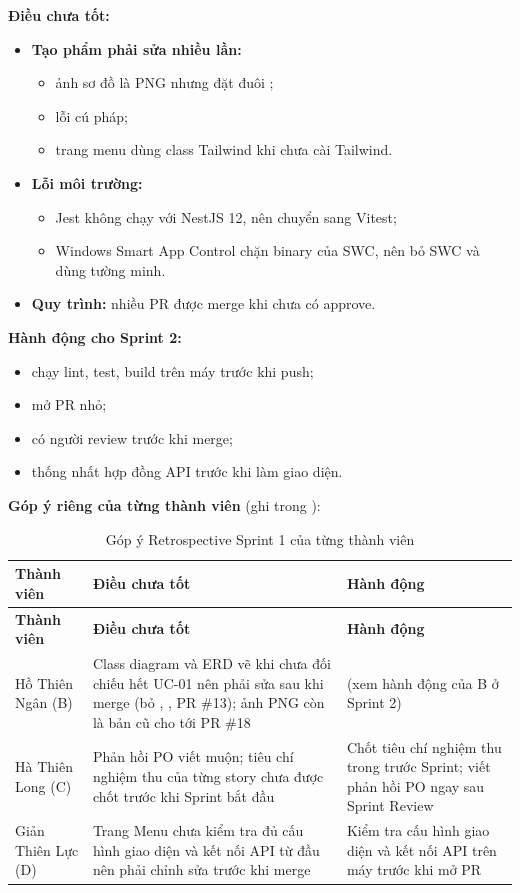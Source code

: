 \textbf{Điều chưa tốt:}
\begin{itemize}
\item \textbf{Tạo phẩm phải sửa nhiều lần:}
  \begin{itemize}
  \item ảnh sơ đồ là PNG nhưng đặt đuôi ;
  \item {} lỗi cú pháp;
  \item trang menu dùng class Tailwind khi chưa cài Tailwind.
  \end{itemize}
\item \textbf{Lỗi môi trường:}
  \begin{itemize}
  \item Jest không chạy với NestJS 12, nên chuyển sang Vitest;
  \item Windows Smart App Control chặn binary của SWC, nên bỏ SWC và dùng  tường minh.
  \end{itemize}
\item \textbf{Quy trình:} nhiều PR được merge khi chưa có approve.
\end{itemize}

\textbf{Hành động cho Sprint 2:}
\begin{itemize}
\item chạy lint, test, build trên máy trước khi push;
\item mở PR nhỏ;
\item có người review trước khi merge;
\item thống nhất hợp đồng API trước khi làm giao diện.
\end{itemize}


\textbf{Góp ý riêng của từng thành viên} (ghi trong ):
\begin{longtable}{@{}L{2.4cm}L{6cm}L{5.4cm}@{}}
\caption{Góp ý Retrospective Sprint 1 của từng thành viên}\label{tab:retro1}\\
\toprule
\textbf{Thành viên} & \textbf{Điều chưa tốt} & \textbf{Hành động} \\ \midrule \endfirsthead
\toprule \textbf{Thành viên} & \textbf{Điều chưa tốt} & \textbf{Hành động} \\ \midrule \endhead
\bottomrule \endfoot
Hồ Thiên Ngân (B) & Class diagram và ERD vẽ khi chưa đối chiếu hết UC-01 nên phải sửa sau khi merge (bỏ , , PR \#13); ảnh PNG còn là bản cũ cho tới PR \#18 & (xem hành động của B ở Sprint 2) \\
Hà Thiên Long (C) & Phản hồi PO viết muộn; tiêu chí nghiệm thu của từng story chưa được chốt trước khi Sprint bắt đầu & Chốt tiêu chí nghiệm thu trong  trước Sprint; viết phản hồi PO ngay sau Sprint Review \\
Giản Thiên Lực (D) & Trang Menu chưa kiểm tra đủ cấu hình giao diện và kết nối API từ đầu nên phải chỉnh sửa trước khi merge & Kiểm tra cấu hình giao diện và kết nối API trên máy trước khi mở PR \\
\end{longtable}

